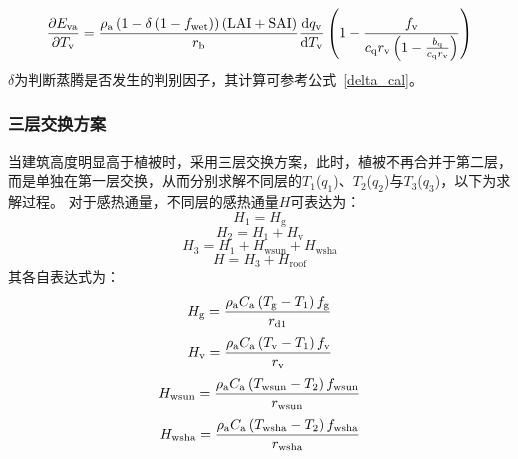 %
\begin{equation}
  \frac{\partial  E_{\mathrm{va}}}{\partial T_{\mathrm{v}}} = \frac{\rho _{\rm a} \left(1-\delta\left(1-f_{\mathrm{wet}}\right)\right)\left({\rm LAI} + {\rm SAI}\right)}{r_{\mathrm{b}}} \frac{{\mathrm {d}} q_{\mathrm{v}}}{{\mathrm {d}} T_{\mathrm{v}}} \left(1-\frac{f_{\mathrm{v}}}{c_{\mathrm{q}} r_{\mathrm{v}}\left(1-\frac{b_{\mathrm{q}}}{c_{\mathrm{q}} r_{\mathrm{v}}}\right)}\right)
\end{equation}
$\delta$为判断蒸腾是否发生的判别因子，其计算可参考公式~\eqref{delta_cal}。
%
%
\subsubsection{三层交换方案}
当建筑高度明显高于植被时，采用三层交换方案，此时，植被不再合并于第二层，而是单独在第一层交换，从而分别求解不同层的$T_{1}$($q_{1}$)、$T_{2}$($q_{2}$)与$T_{3}$($q_{3}$)，以下为求解过程。
对于感热通量，不同层的感热通量$H$可表达为：
%
\begin{equation}
  \label{3lay_H1_veg}
  H_{1} = H_{\mathrm{g}}
\end{equation}
%
\begin{equation}
  H_{2} = H_{1}+H_{\mathrm{v}}
\end{equation}
%
\begin{equation}
  H_{3} = H_{1}+H_{\mathrm{wsun}}+H_{\mathrm{wsha}}
\end{equation}
%
\begin{equation}
  \label{3lay_H3_veg}
  H = H_{3}+H_{\mathrm{roof}}
\end{equation}
其各自表达式为：
\begin{equation}\label{urban_Hg_3_veg}
  H_{\mathrm{g}} = \frac{\rho _{\rm a} C_{\mathrm a} \left( T_{\mathrm{g}} - T_{1} \right) f_{\mathrm{g}}}{r_{\mathrm{d1}}}
\end{equation}
%
\begin{equation}
  H_{\mathrm{v}} = \frac{\rho _{\rm a} C_{\mathrm a} \left( T_{\mathrm{v}} - T_{1} \right) f_{\rm v}}{r_{\mathrm{v}}}
\end{equation}
%
\begin{equation}
  H_{\mathrm{wsun}} = \frac{\rho  _{\rm a} C_{\mathrm a} \left( T_{\mathrm{wsun}} - T_{2} \right) f_{\mathrm{wsun}}}{r_{\mathrm{wsun}}}
\end{equation}
%
\begin{equation}
  H_{\mathrm{wsha}} = \frac{\rho _{\rm a} C_{\mathrm a} \left( T_{\mathrm{wsha}} - T_{2} \right) f_{\mathrm{wsha}}}{r_{\mathrm{wsha}}}
\end{equation}

